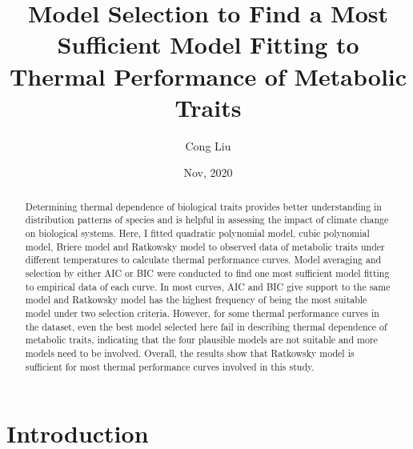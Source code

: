 \documentclass[11pt]{article}
\title{Model Selection to Find a Most Sufficient Model Fitting to Thermal Performance of Metabolic Traits\footnotemark[1]}
\author{Cong Liu\footnotemark[2]}
\date{Nov, 2020}
\begin{document}
  \maketitle
  \newpage
    
  \linenumbers
  \begin{abstract}
    Determining thermal dependence of biological traits provides better understanding in distribution patterns of species 
    and is helpful in assessing the impact of climate change on biological systems. Here, I fitted quadratic polynomial 
    model, cubic polynomial model, Briere model and Ratkowsky model to observed data of metabolic traits under different 
    temperatures to calculate thermal performance curves. Model averaging and selection by either AIC or BIC were 
    conducted to find one most sufficient model fitting to empirical data of each curve. 
    In most curves, AIC and BIC give support to 
    the same model and Ratkowsky model has the highest frequency of being the most suitable model 
    under two selection criteria. However, for some thermal performance curves in the dataset, even the best model 
    selected here fail in describing thermal dependence of metabolic traits, indicating that the four plausible models 
    are not suitable and more models need to be involved. Overall, the results show that Ratkowsky model is sufficient 
    for most thermal performance curves involved in this study.

  \end{abstract}

  \section{Introduction}
\end{document}
